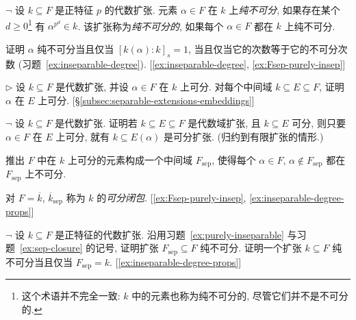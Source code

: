 \begin{prob}\label{ex:purely-inseparable}
$\neg$ 设 $k\subseteq F$ 是正特征 $p$ 的代数扩张. 元素 $\alpha\in F$ 在 $k$ 上\emph{纯不可分}, 如果存在某个 $d\geq 0$\footnote{这个术语并不完全一致: $k$ 中的元素也称为纯不可分的, 尽管它们并不是不可分的.} 有 $\alpha^{p^d}\in k$. 该扩张称为\emph{纯不可分的}, 如果每个 $\alpha\in F$ 都在 $k$ 上纯不可分.

证明 $\alpha$ 纯不可分当且仅当 $[k(\alpha):k]_s=1$, 当且仅当它的次数等于它的不可分次数 (习题~\ref{ex:inseparable-degree}). [\ref{ex:inseparable-degree}, \ref{ex:Fsep-purely-insep}]
\end{prob}

\begin{prob}\label{ex:separable-over-intermediate}
$\triangleright$ 设 $k\subseteq F$ 是代数扩张, 并设 $\alpha\in F$ 在 $k$ 上可分. 对每个中间域 $k\subseteq E\subseteq F$, 证明 $\alpha$ 在 $E$ 上可分. [§\ref{subsec:separable-extensions-embeddings}]
\end{prob}

\begin{prob}\label{ex:sep-closure}
$\neg$ 设 $k\subseteq F$ 是代数扩张. 证明若 $k\subseteq E\subseteq F$ 是代数域扩张, 且 $k\subseteq E$ 可分, 则只要 $\alpha\in F$ 在 $E$ 上可分, 就有 $k\subseteq E(\alpha)$ 是可分扩张. (归约到有限扩张的情形.)

推出 $F$ 中在 $k$ 上可分的元素构成一个中间域 $F_{\mathrm{sep}}$, 使得每个 $\alpha\in F$, $\alpha\notin F_{\mathrm{sep}}$ 都在 $F_{\mathrm{sep}}$ 上不可分.

对 $F=\overline{k}$, $\overline{k}_{\mathrm{sep}}$ 称为 $k$ 的\emph{可分闭包}. [\ref{ex:Fsep-purely-insep}, \ref{ex:inseparable-degree-props}]
\end{prob}

\begin{prob}\label{ex:Fsep-purely-insep}
$\neg$ 设 $k\subseteq F$ 是正特征的代数扩张. 沿用习题~\ref{ex:purely-inseparable} 与习题~\ref{ex:sep-closure} 的记号, 证明扩张 $F_{\mathrm{sep}}\subseteq F$ 纯不可分. 证明一个扩张 $k\subseteq F$ 纯不可分当且仅当 $F_{\mathrm{sep}}=k$. [\ref{ex:inseparable-degree-props}]
\end{prob}

